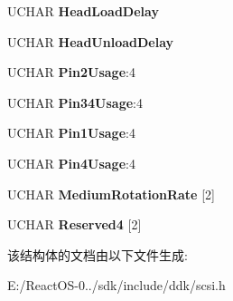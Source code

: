 \begin{DoxyCompactItemize}
U\+C\+H\+AR {\bfseries Head\+Load\+Delay}
\item 
\mbox{\label{struct___m_o_d_e___f_l_e_x_i_b_l_e___d_i_s_k___p_a_g_e_a3842e996be0814e333f2a9c90125c1a9}} 
U\+C\+H\+AR {\bfseries Head\+Unload\+Delay}
\item 
\mbox{\label{struct___m_o_d_e___f_l_e_x_i_b_l_e___d_i_s_k___p_a_g_e_a93b798f2315a047b2c08cc5fb33c5761}} 
U\+C\+H\+AR {\bfseries Pin2\+Usage}\+:4
\item 
\mbox{\label{struct___m_o_d_e___f_l_e_x_i_b_l_e___d_i_s_k___p_a_g_e_a49a2eeb605aafdc3d57baa1dacaa7d3c}} 
U\+C\+H\+AR {\bfseries Pin34\+Usage}\+:4
\item 
\mbox{\label{struct___m_o_d_e___f_l_e_x_i_b_l_e___d_i_s_k___p_a_g_e_a57f935182802dd17fd813be13e5b405a}} 
U\+C\+H\+AR {\bfseries Pin1\+Usage}\+:4
\item 
\mbox{\label{struct___m_o_d_e___f_l_e_x_i_b_l_e___d_i_s_k___p_a_g_e_a6e79b8bc660188b3e4af06f062a7d1d7}} 
U\+C\+H\+AR {\bfseries Pin4\+Usage}\+:4
\item 
\mbox{\label{struct___m_o_d_e___f_l_e_x_i_b_l_e___d_i_s_k___p_a_g_e_a87addc37b2b4524a53f026ebf3fb6160}} 
U\+C\+H\+AR {\bfseries Medium\+Rotation\+Rate} \mbox{[}2\mbox{]}
\item 
\mbox{\label{struct___m_o_d_e___f_l_e_x_i_b_l_e___d_i_s_k___p_a_g_e_a5c773b7f2ccac491f8824883def0a165}} 
U\+C\+H\+AR {\bfseries Reserved4} \mbox{[}2\mbox{]}
\end{DoxyCompactItemize}


该结构体的文档由以下文件生成\+:\begin{DoxyCompactItemize}
\item 
E\+:/\+React\+O\+S-\/0../sdk/include/ddk/scsi.\+h\end{DoxyCompactItemize}

